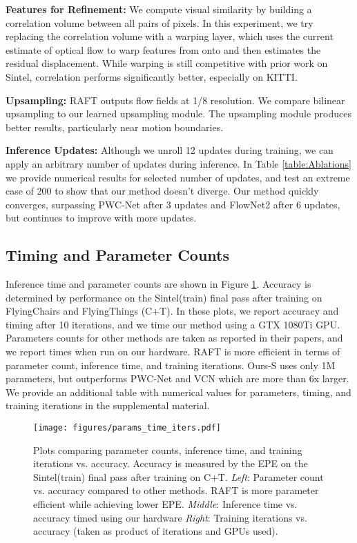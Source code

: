 \documentclass[runningheads]{llncs}
\begin{document}
\smallskip \noindent \textbf{Features for Refinement: } We compute visual similarity by building a correlation volume between all pairs of pixels. In this experiment, we try replacing the correlation volume with a warping layer, which uses the current estimate of optical flow to warp features from  onto  and then estimates the residual displacement. While warping is still competitive with prior work on Sintel, correlation performs significantly better, especially on KITTI.

\smallskip \noindent \textbf{Upsampling: } RAFT outputs flow fields at 1/8 resolution. We compare bilinear upsampling to our learned upsampling module. The upsampling module produces better results, particularly near motion boundaries.

\smallskip \noindent \textbf{Inference Updates: } Although we unroll 12 updates during training, we can apply an arbitrary number of updates during inference. In Table \ref{table:Ablations} we provide numerical results for selected number of updates, and test an extreme case of 200 to show that our method doesn't diverge. Our method quickly converges, surpassing PWC-Net after 3 updates and FlowNet2 after 6 updates, but continues to improve with more updates. 


\subsection{Timing and Parameter Counts}
Inference time and parameter counts are shown in Figure \ref{fig:ParametersTimingIterations}. Accuracy is determined by performance on the Sintel(train) final pass after training on FlyingChairs and FlyingThings (C+T). In these plots, we report accuracy and timing after 10 iterations, and we time our method using a GTX 1080Ti GPU. Parameters counts for other methods are taken as reported in their papers, and we report times when run on our hardware. RAFT is more efficient in terms of parameter count, inference time, and training iterations. Ours-S uses only 1M parameters, but outperforms PWC-Net and VCN which are more than 6x larger. We provide an additional table with numerical values for parameters, timing, and training iterations in the supplemental material. 


\begin{figure}[h]
    \centering
	\texttt{[image: figures/params\_time\_iters.pdf]}
	\caption{Plots comparing parameter counts, inference time, and training iterations vs. accuracy. Accuracy is measured by the EPE on the Sintel(train) final pass after training on C+T. \emph{Left}: Parameter count vs. accuracy compared to other methods. RAFT is more parameter efficient while achieving lower EPE. \emph{Middle}: Inference time vs. accuracy timed using our hardware \emph{Right}: Training iterations vs. accuracy (taken as product of iterations and GPUs used).}
	\label{fig:ParametersTimingIterations}
\end{figure}
\end{document}
